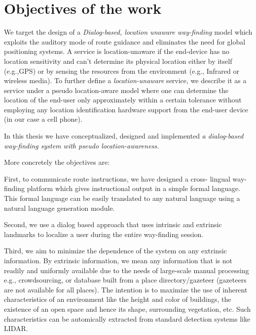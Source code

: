 \documentclass{iitkthesis}
\begin{document}

 \section{Objectives of the work}
We target the design of a \textit{Dialog-based, location unaware way-finding
} model which exploits the auditory mode of route guidance and eliminates 
the need for global positioning systems. A service is location-unaware if 
the end-device has no location sensitivity and can't determine its 
physical location either by itself (e.g.,GPS) or by sensing the resources 
from the environment (e.g., Infrared or wireless media). To further 
define a \textit{location-unaware} service, we describe it as a service 
under a pseudo location-aware model where one can determine the 
location of the end-user only approximately within a certain tolerance
without employing any location identification hardware support from the 
end-user device (in our case a cell phone). 

In this thesis we have conceptualized, designed and implemented
{
\textit{a dialog-based way-finding system with pseudo location-awareness.}
}

More concretely the objectives are:

First, to communicate route instructions, we have designed a cross-
lingual way-finding platform which gives instructional output in a simple
formal language. This formal language can be easily translated to
any natural language using a natural language generation module.

Second, we use a dialog based approach that uses intrinsic and extrinsic
landmarks to localize a user during the entire way-finding session.

Third, we aim to minimize the dependence of the system on any extrinsic 
information. By extrinsic information, we mean any information that is 
not readily and uniformly available due to the needs of large-scale 
manual processing e.g., crowdsourcing, or database built from a place 
directory/gazeteer (gazeteers are not available for all places). The 
intention is to maximize the use of inherent characteristics of an 
environment like the height and color of buildings, the existence of an 
open space and hence its shape, surrounding vegetation, etc. Such 
characteristics can be automically extracted from standard detection 
systems like LIDAR.
\end{document}
